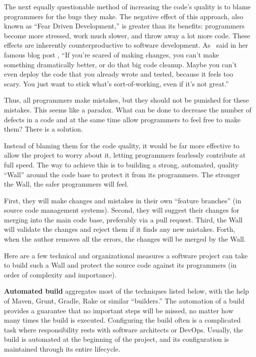\documentclass{main}
\begin{document}
The next equally questionable method of increasing the code's quality is to blame
programmers for the bugs they make. The negative effect of this approach, also
known as ``Fear Driven Development,''
is greater than its benefits: programmers become more stressed, work much slower, and throw away a lot more code.
These effects are inherently counterproductive to software development.
As~\textcite{evans14} said in her famous blog post ,
``If you're scared of making changes, you can't make something dramatically
better, or do that big code cleanup. Maybe you can't even deploy the code
that you already wrote and tested, because it feels too scary. You
just want to stick what's sort-of-working, even if it's not great.''

Thus, all programmers make mistakes, but they should not be punished for these mistakes.
This seems like a paradox. What can be done to decrease
the number of defects in a code and at the same time allow programmers to feel
free to make them? There is a solution.

Instead of blaming them for the code quality,
it would be far more effective to allow the project to worry about it, letting
programmers fearlessly contribute at full speed. The way to achieve this is to building a strong, automated, quality ``Wall'' around the code base to protect it from its programmers. The stronger the Wall, the safer programmers will feel.

First, they will make changes and mistakes in their own
``feature branches'' (in source code management systems).
Second, they will suggest their changes for merging into the main code base,
preferably via a pull request. Third, the Wall will validate the changes and
reject them if it finds any new mistakes. Forth, when the author removes all the errors, the changes will be merged by the Wall.

Here are a few technical and organizational measures a software
project can take to build such a Wall and protect the source code against its programmers
(in order of complexity and importance).

\textbf{Automated build} aggregates most of the techniques listed below,
with the help of Maven, Grunt, Gradle, Rake or similar ``builders.'' The
automation of a build provides a guarantee that no important steps will be missed,
no matter how many times the build is executed. Configuring the build
often is a complicated task where responsibility rests with software architects or DevOps. Usually, the build is automated at the beginning
of the project, and its configuration is maintained through its entire
lifecycle.
\end{document}
